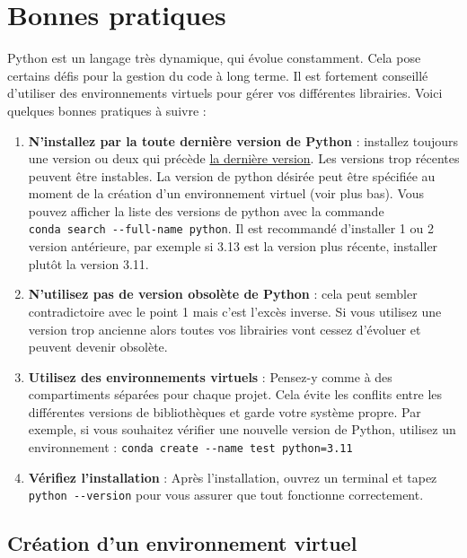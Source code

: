 \documentclass[
  11pt,
  letterpaper,
  open=any,
  twoside=false,
  french]{scrbook}
\begin{document}
\section{Bonnes pratiques}\label{bonnes-pratiques}

Python est un langage très dynamique, qui évolue constamment. Cela pose
certains défis pour la gestion du code à long terme. Il est fortement
conseillé d'utiliser des environnements virtuels pour gérer vos
différentes librairies. Voici quelques bonnes pratiques à suivre :

\begin{enumerate}
\def\labelenumi{\arabic{enumi}.}
\item
  \textbf{N'installez par la toute dernière version de Python} :
  installez toujours une version ou deux qui précède
  \href{https://www.python.org/downloads/}{la dernière version}. Les
  versions trop récentes peuvent être instables. La version de python
  désirée peut être spécifiée au moment de la création d'un
  environnement virtuel (voir plus bas). Vous pouvez afficher la liste
  des versions de python avec la commande
  \texttt{conda\ search\ -\/-full-name\ python}. Il est recommandé
  d'installer 1 ou 2 version antérieure, par exemple si 3.13 est la
  version plus récente, installer plutôt la version 3.11.
\item
  \textbf{N'utilisez pas de version obsolète de Python} : cela peut
  sembler contradictoire avec le point 1 mais c'est l'excès inverse. Si
  vous utilisez une version trop ancienne alors toutes vos librairies
  vont cessez d'évoluer et peuvent devenir obsolète.
\item
  \textbf{Utilisez des environnements virtuels} : Pensez-y comme à des
  compartiments séparées pour chaque projet. Cela évite les conflits
  entre les différentes versions de bibliothèques et garde votre système
  propre. Par exemple, si vous souhaitez vérifier une nouvelle version
  de Python, utilisez un environnement :
  \texttt{conda\ create\ -\/-name\ test\ python=3.11}
\item
  \textbf{Vérifiez l'installation} : Après l'installation, ouvrez un
  terminal et tapez \texttt{python\ -\/-version} pour vous assurer que
  tout fonctionne correctement.
\end{enumerate}

\subsection{Création d'un environnement virtuel}\label{sec-00-01}
\end{document}
